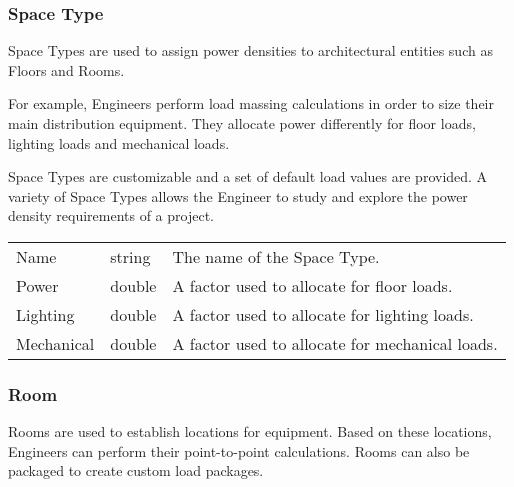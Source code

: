 \documentclass[letterpaper,10pt,english]{sphinxmanual}
\begin{document}
\subsubsection{Space Type}
\label{\detokenize{docs/definitions/index-definitions:space-type}}\label{\detokenize{docs/definitions/index-definitions:spacetype-definition}}
Space Types are used to assign power densities to architectural entities such as Floors and Rooms.

For example, Engineers perform load massing calculations in order to size their main distribution equipment.  They allocate power differently for floor loads, lighting loads and mechanical loads.

Space Types are customizable and a set of default load values are provided.  A variety of Space Types allows the Engineer to study and explore the power density requirements of a project.


\begin{savenotes}\sphinxattablestart
\centering
\begin{tabulary}{\linewidth}[t]{|T|T|T|}
\hline
\sphinxstyletheadfamily 
{}
&\sphinxstyletheadfamily 
{}
&\sphinxstyletheadfamily 
{}
\\
\hline
Name
&
string
&
The name of the Space Type.
\\
\hline
Power
&
double
&
A factor used to allocate for floor loads.
\\
\hline
Lighting
&
double
&
A factor used to allocate for lighting loads.
\\
\hline
Mechanical
&
double
&
A factor used to allocate for mechanical loads.
\\
\hline
\end{tabulary}
\par
\sphinxattableend\end{savenotes}


\subsubsection{Room}
\label{\detokenize{docs/definitions/index-definitions:room}}\label{\detokenize{docs/definitions/index-definitions:room-definition}}
Rooms are used to establish locations for equipment.  Based on these locations, Engineers can perform their point-to-point calculations.  Rooms can also be packaged to create custom load packages.
\end{document}
